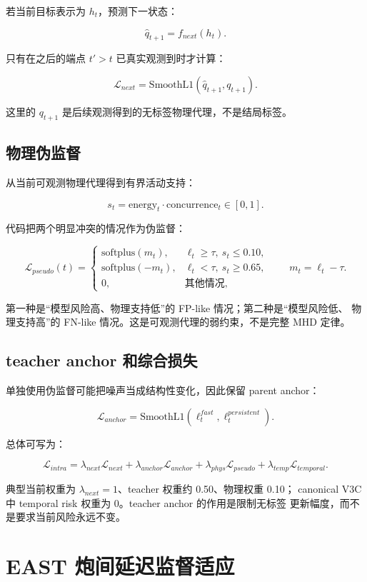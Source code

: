 \documentclass[11pt,a4paper]{article}
\begin{document}
若当前目标表示为 \(h_t\)，预测下一状态：

\[
\widehat q_{t+1}=f_{next}(h_t).
\]

只有在之后的端点 \(t'>t\) 已真实观测到时才计算：

\[
\mathcal{L}_{next}
=\mathrm{SmoothL1}(\widehat q_{t+1},q_{t+1}).
\]

这里的 \(q_{t+1}\) 是后续观测得到的无标签物理代理，不是结局标签。

\subsection{物理伪监督}

从当前可观测物理代理得到有界活动支持：

\[
s_t=\mathrm{energy}_t\cdot\mathrm{concurrence}_t\in[0,1].
\]

代码把两个明显冲突的情况作为伪监督：

\[
\mathcal{L}_{pseudo}(t)=
\begin{cases}
\mathrm{softplus}(m_t),
&\ell_t\ge\tau,\ s_t\le0.10,\\
\mathrm{softplus}(-m_t),
&\ell_t<\tau,\ s_t\ge0.65,\\
0,&\text{其他情况},
\end{cases}
\qquad m_t=\ell_t-\tau.
\]

第一种是“模型风险高、物理支持低”的 FP-like 情况；第二种是“模型风险低、
物理支持高”的 FN-like 情况。这是可观测代理的弱约束，不是完整 MHD 定律。

\subsection{teacher anchor 和综合损失}

单独使用伪监督可能把噪声当成结构性变化，因此保留 parent anchor：

\[
\mathcal{L}_{anchor}
=\mathrm{SmoothL1}(\ell^{fast}_t,\ell^{persistent}_t).
\]

总体可写为：

\[
\mathcal{L}_{intra}
=\lambda_{next}\mathcal{L}_{next}
+\lambda_{anchor}\mathcal{L}_{anchor}
+\lambda_{phys}\mathcal{L}_{pseudo}
+\lambda_{temp}\mathcal{L}_{temporal}.
\]

典型当前权重为 \(\lambda_{next}=1\)、teacher 权重约 0.50、物理权重 0.10；
canonical V3C 中 temporal risk 权重为 0。teacher anchor 的作用是限制无标签
更新幅度，而不是要求当前风险永远不变。

\section{EAST 炮间延迟监督适应}
\end{document}
